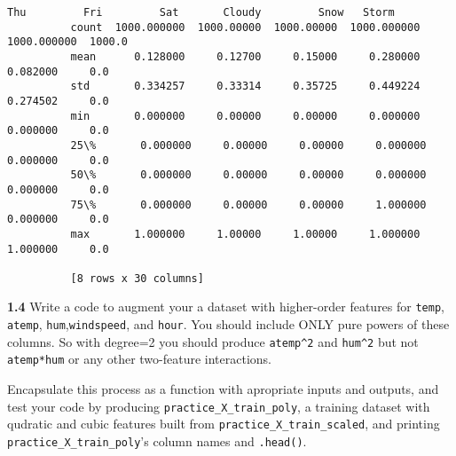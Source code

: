 \documentclass[11pt]{article}
\begin{document}
\begin{Verbatim}[commandchars=\\\{\}]
                         Thu         Fri         Sat       Cloudy         Snow   Storm  
          count  1000.000000  1000.00000  1000.00000  1000.000000  1000.000000  1000.0  
          mean      0.128000     0.12700     0.15000     0.280000     0.082000     0.0  
          std       0.334257     0.33314     0.35725     0.449224     0.274502     0.0  
          min       0.000000     0.00000     0.00000     0.000000     0.000000     0.0  
          25\%       0.000000     0.00000     0.00000     0.000000     0.000000     0.0  
          50\%       0.000000     0.00000     0.00000     0.000000     0.000000     0.0  
          75\%       0.000000     0.00000     0.00000     1.000000     0.000000     0.0  
          max       1.000000     1.00000     1.00000     1.000000     1.000000     0.0  
          
          [8 rows x 30 columns]
\end{Verbatim}
            
    \textbf{1.4} Write a code to augment your a dataset with higher-order
features for \texttt{temp}, \texttt{atemp},
\texttt{hum},\texttt{windspeed}, and \texttt{hour}. You should include
ONLY pure powers of these columns. So with degree=2 you should produce
\texttt{atemp\^{}2} and \texttt{hum\^{}2} but not \texttt{atemp*hum} or
any other two-feature interactions.

Encapsulate this process as a function with apropriate inputs and
outputs, and test your code by producing
\texttt{practice\_X\_train\_poly}, a training dataset with qudratic and
cubic features built from \texttt{practice\_X\_train\_scaled}, and
printing \texttt{practice\_X\_train\_poly}'s column names and
\texttt{.head()}.
\end{document}
